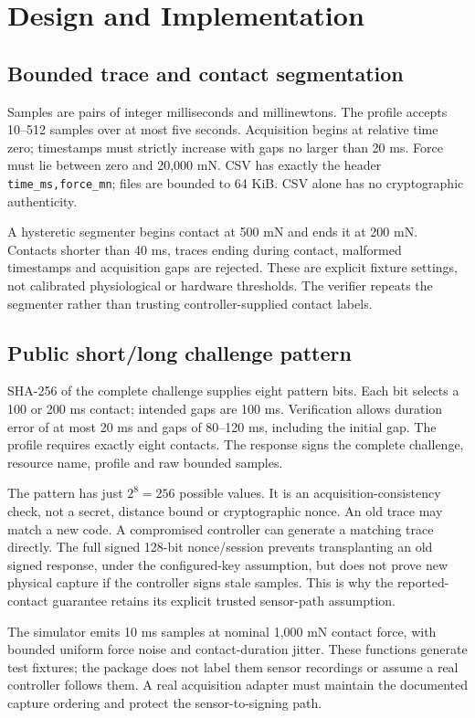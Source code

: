 \section{Design and Implementation}
\subsection{Bounded trace and contact segmentation}
Samples are pairs of integer milliseconds and millinewtons. The profile accepts
10--512 samples over at most five seconds. Acquisition begins at relative time
zero; timestamps must strictly increase with gaps no larger than 20 ms. Force
must lie between zero and 20,000 mN. CSV has exactly the header
\texttt{time\_ms,force\_mn}; files are bounded to 64 KiB. CSV alone has no
cryptographic authenticity.

A hysteretic segmenter begins contact at 500 mN and ends it at 200 mN. Contacts
shorter than 40 ms, traces ending during contact, malformed timestamps and
acquisition gaps are rejected. These are explicit fixture settings, not
calibrated physiological or hardware thresholds. The verifier repeats the
segmenter rather than trusting controller-supplied contact labels.

\subsection{Public short/long challenge pattern}
SHA-256 of the complete challenge supplies eight pattern bits. Each bit selects
a 100 or 200 ms contact; intended gaps are 100 ms. Verification allows duration
error of at most 20 ms and gaps of 80--120 ms, including the initial gap. The
profile requires exactly eight contacts. The response signs the complete
challenge, resource name, profile and raw bounded samples.

The pattern has just $2^8=256$ possible values. It is an acquisition-consistency
check, not a secret, distance bound or cryptographic nonce. An old trace may match
a new code. A compromised controller can generate a matching trace directly.
The full signed 128-bit nonce/session prevents transplanting an old signed
response, under the configured-key assumption, but does not prove new physical
capture if the controller signs stale samples. This is why the reported-contact
guarantee retains its explicit trusted sensor-path assumption.

The simulator emits 10 ms samples at nominal 1,000 mN contact force, with bounded
uniform force noise and contact-duration jitter. These functions generate test
fixtures; the package does not label them sensor recordings or assume a real
controller follows them. A real acquisition adapter must maintain the documented
capture ordering and protect the sensor-to-signing path.
